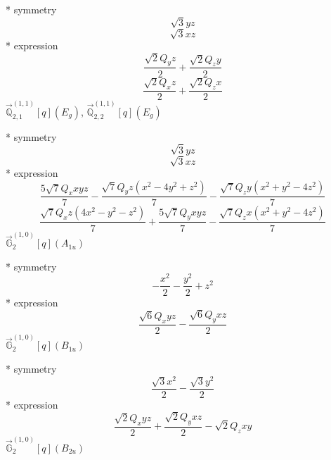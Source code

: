 \documentclass[fleqn,8pt]{jsarticle}
\begin{document}
\noindent\quad ** symmetry
\begin{dmath*}
\sqrt{3} y z
\end{dmath*}
\begin{dmath*}
\sqrt{3} x z
\end{dmath*}
\noindent\quad ** expression
\begin{dmath*}
\frac{\sqrt{2} Q_{y} z}{2} + \frac{\sqrt{2} Q_{z} y}{2}
\end{dmath*}
\begin{dmath*}
\frac{\sqrt{2} Q_{x} z}{2} + \frac{\sqrt{2} Q_{z} x}{2}
\end{dmath*}
\noindent\quad $\vec{\mathbb{Q}}_{2,1}^{(1,1)}[q](E_{g})$, $\vec{\mathbb{Q}}_{2,2}^{(1,1)}[q](E_{g})$

\noindent\quad ** symmetry
\begin{dmath*}
\sqrt{3} y z
\end{dmath*}
\begin{dmath*}
\sqrt{3} x z
\end{dmath*}
\noindent\quad ** expression
\begin{dmath*}
\frac{5 \sqrt{7} Q_{x} x y z}{7} - \frac{\sqrt{7} Q_{y} z \left(x^{2} - 4 y^{2} + z^{2}\right)}{7} - \frac{\sqrt{7} Q_{z} y \left(x^{2} + y^{2} - 4 z^{2}\right)}{7}
\end{dmath*}
\begin{dmath*}
\frac{\sqrt{7} Q_{x} z \left(4 x^{2} - y^{2} - z^{2}\right)}{7} + \frac{5 \sqrt{7} Q_{y} x y z}{7} - \frac{\sqrt{7} Q_{z} x \left(x^{2} + y^{2} - 4 z^{2}\right)}{7}
\end{dmath*}
\noindent\quad $\vec{\mathbb{G}}_{2}^{(1,0)}[q](A_{1u})$

\noindent\quad ** symmetry
\begin{dmath*}
- \frac{x^{2}}{2} - \frac{y^{2}}{2} + z^{2}
\end{dmath*}
\noindent\quad ** expression
\begin{dmath*}
\frac{\sqrt{6} Q_{x} y z}{2} - \frac{\sqrt{6} Q_{y} x z}{2}
\end{dmath*}
\noindent\quad $\vec{\mathbb{G}}_{2}^{(1,0)}[q](B_{1u})$

\noindent\quad ** symmetry
\begin{dmath*}
\frac{\sqrt{3} x^{2}}{2} - \frac{\sqrt{3} y^{2}}{2}
\end{dmath*}
\noindent\quad ** expression
\begin{dmath*}
\frac{\sqrt{2} Q_{x} y z}{2} + \frac{\sqrt{2} Q_{y} x z}{2} - \sqrt{2} Q_{z} x y
\end{dmath*}
\noindent\quad $\vec{\mathbb{G}}_{2}^{(1,0)}[q](B_{2u})$
\end{document}
